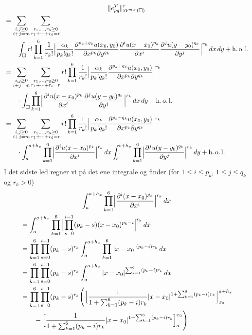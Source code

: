 \begin{multline} \label{kompl}
  \|e_{pq}^T\|_{{\mathcal W}^{m,r}(\Box)}^r \\
\begin{split}
  &= \sum_{\substack{ i,j\geq 0 \\ i+j=m }}
  \sum_{\substack{ r_1,\ldots ,r_6 \geq 0 \\ r_1+\cdots +r_6=r}} \\
  &\qquad  \int_\Box r! \prod_{k=1}^6 \frac{1}{r_k!} \Bigl|
  \frac{\alpha_k}{p_k!q_k!} \frac{\partial^{p_k+q_k}u(x_0,y_0)}{\partial x^{p_k}\partial y^{q_k}}
  \frac{\partial^i u(x-x_0)^{p_k}}{\partial x^i} \frac{\partial^j u(y-y_0)^{q_k}}{\partial y^j}
  \Bigr|^{r_k}\, dx\, dy + \operatorname{h.o.l.} \\
  &= \sum_{\substack{ i,j\geq 0 \\ i+j=m }}
  \sum_{\substack{ r_1,\ldots ,r_6 \geq 0 \\ r_1+\cdots +r_6=r}}
  r! \prod_{k=1}^6 \frac{1}{r_k!} \Bigl|
  \frac{\alpha_k}{p_k!q_k!} \frac{\partial^{p_k+q_k}u(x_0,y_0)}{\partial x^{p_k}\partial y^{q_k}}
  \Bigr|^{r_k} \\
  &\qquad \cdot \int_\Box \prod_{k=1}^6 \Bigl|
  \frac{\partial^i u(x-x_0)^{p_k}}{\partial x^i} \frac{\partial^j u(y-y_0)^{q_k}}{\partial y^j}
  \Bigr|^{r_k}\, dx\, dy + \operatorname{h.o.l.} \\
  &= \sum_{\substack{ i,j\geq 0 \\ i+j=m }}
  \sum_{\substack{ r_1,\ldots ,r_6 \geq 0 \\ r_1+\cdots +r_6=r}}
  r! \prod_{k=1}^6 \frac{1}{r_k!} \Bigl|
  \frac{\alpha_k}{p_k!q_k!} \frac{\partial^{p_k+q_k}u(x_0,y_0)}{\partial x^{p_k}\partial y^{q_k}}
  \Bigr|^{r_k} \\
  &\qquad \cdot \int_{a}^{a+h_x} \prod_{k=1}^6 \Bigl|
  \frac{\partial^i u(x-x_0)^{p_k}}{\partial x^i} \Bigr|^{r_k}\, dx
  \int_{b}^{b+h_y} \prod_{k=1}^6 \Bigl|
  \frac{\partial^j u(y-y_0)^{q_k}}{\partial y^j} \Bigr|^{r_k}\, dy + \operatorname{h.o.l.} \\
\end{split}
\end{multline}
I det sidste led regner vi på det ene integrale og finder (for
$1\leq i\leq p_k$, $1\leq j\leq q_k$ og $r_k>0$)
\begin{multline}
  \int_{a}^{a+h_x} \prod_{k=1}^6 \Bigl|
  \frac{\partial^i (x-x_0)^{p_k}}{\partial x^i} \Bigr|^{r_k}\, dx \\
\begin{split}
  &= \int_{a}^{a+h_x} \prod_{k=1}^6 \Bigl| \, \prod_{s=0}^{i-1}
  (p_k-s) (x-x_0)^{p_k-i}\Bigl|^{r_k}\, dx \\
  &= \prod_{k=1}^6 \prod_{s=0}^{i-1} (p_k-s)^{r_k}
  \int_{a}^{a+h_x} \prod_{k=1}^6 |x-x_0|^{(p_k-i)r_k}\, dx \\
  &= \prod_{k=1}^6 \prod_{s=0}^{i-1} (p_k-s)^{r_k}
  \int_{a}^{a+h_x} |x-x_0|^{\sum_{k=1}^6 (p_k-i)r_k}\, dx \\
  &= \prod_{k=1}^6 \prod_{s=0}^{i-1} (p_k-s)^{r_k}
  \Biggl( \Bigl[ \frac{1}{1+\sum_{k=1}^6 (p_k-i)r_k}
  |x-x_0|^{1+\sum_{k=1}^6 (p_k-i)r_k} \Bigr]_{x_0}^{a+h_x} \\
  &\qquad - \Bigl[ \frac{1}{1+\sum_{k=1}^6 (p_k-i)r_k}
  |x-x_0|^{1+\sum_{k=1}^6 (p_k-i)r_k} \Bigr]_a^{x_0} \Biggr) \\
\end{split}
\end{multline}

